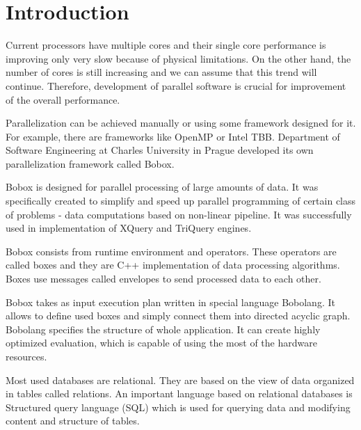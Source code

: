 \chapter{Introduction}

Current processors have multiple cores and their single core performance is improving only very slow because of physical limitations. On the other hand, the number of cores is still increasing and we can assume that this trend will continue. Therefore, development of parallel software is crucial for improvement of the overall performance.

Parallelization can be achieved manually or using some framework designed for it. For example, there are frameworks like OpenMP or Intel TBB. Department of Software Engineering at Charles University in Prague developed its own parallelization framework called Bobox\cite{bobox}.

Bobox is designed for parallel processing of large amounts of data. It was specifically created to simplify and speed up parallel programming of certain class of problems - data computations based on non-linear pipeline. It was successfully used in implementation of XQuery and TriQuery engines.

Bobox consists from runtime environment and operators. These operators are called boxes and they are C++ implementation of data processing algorithms. Boxes use messages called envelopes to send processed data to each other. 

Bobox takes as input execution plan written in special language Bobolang\cite{bobolang}. It allows to define used boxes and simply connect them into directed acyclic graph. Bobolang specifies the structure of whole application. It can create highly optimized evaluation, which is capable of using the most of the hardware resources.

Most used databases are relational. They are based on the view of data organized in tables called relations. An important language based on relational databases is Structured query language (SQL\cite{database}) which is used for querying data and  modifying content and structure of tables.

